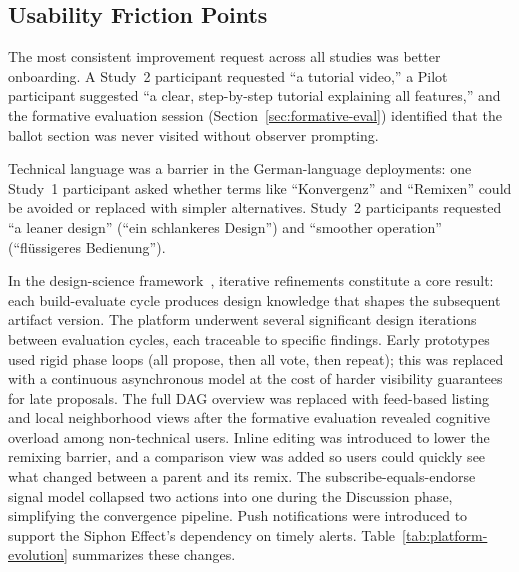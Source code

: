 \documentclass[a4paper, 12pt, twoside]{iviathesis}
\begin{document}
\subsection{Usability Friction Points}
\label{sec:usability-friction}

The most consistent improvement request across all studies was better onboarding. A Study~2 participant requested ``a tutorial video,'' a Pilot participant suggested ``a clear, step-by-step tutorial explaining all features,'' and the formative evaluation session (Section~\ref{sec:formative-eval}) identified that the ballot section was never visited without observer prompting.

Technical language was a barrier in the German-language deployments: one Study~1 participant asked whether terms like ``Konvergenz'' and ``Remixen'' could be avoided or replaced with simpler alternatives. Study~2 participants requested ``a leaner design'' (``ein schlankeres Design'') and ``smoother operation'' (``fl\"ussigeres Bedienung'').

In the design-science framework~\cite{hevner2004design}, iterative refinements constitute a core result: each build-evaluate cycle produces design knowledge that shapes the subsequent artifact version. The platform underwent several significant design iterations between evaluation cycles, each traceable to specific findings. Early prototypes used rigid phase loops (all propose, then all vote, then repeat); this was replaced with a continuous asynchronous model at the cost of harder visibility guarantees for late proposals. The full DAG overview was replaced with feed-based listing and local neighborhood views after the formative evaluation revealed cognitive overload among non-technical users. Inline editing was introduced to lower the remixing barrier, and a comparison view was added so users could quickly see what changed between a parent and its remix. The subscribe-equals-endorse signal model collapsed two actions into one during the Discussion phase, simplifying the convergence pipeline. Push notifications were introduced to support the Siphon Effect's dependency on timely alerts. Table~\ref{tab:platform-evolution} summarizes these changes.
\end{document}
